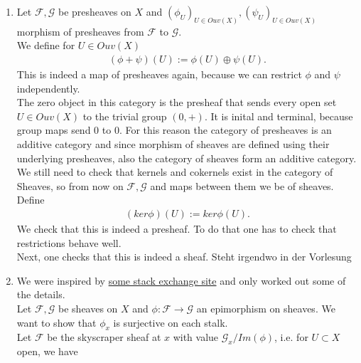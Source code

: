 \begin{exercise}{3}
    \begin{enumerate}
        \item Let $\mathcal{F}, \mathcal{G}$ be presheaves on $X$ and $(\phi_U)_{U\in Ouv(X)}, 
        (\psi_U)_{U\in Ouv(X)}$ morphism of presheaves from $\mathcal{F}$ to $\mathcal{G}$.\\
        We define for $U\in Ouv(X)$
        \begin{align*}
            (\phi+\psi)(U):=\phi(U)\oplus \psi(U).
        \end{align*}
        This is indeed a map of presheaves again, because we can
        restrict $\phi$ and $\psi$ independently.\\
        The zero object in this category is the presheaf that sends 
        every open set $U\in Ouv(X)$ to the trivial group $(0,+)$. 
        It is inital and terminal, because group maps send $0$ to $0$.
        For this reason the category of presheaves is an additive category
        and since morphism of sheaves are defined using their underlying
        presheaves, also the category of sheaves form an additive category.\\
        We still need to check that kernels and cokernels exist in the 
        category of Sheaves, so from now on $\mathcal{F},\mathcal{G}$
        and maps between them we be of sheaves.\\
        Define 
        \begin{align*}
            (ker\phi)(U):=ker\phi(U).
        \end{align*}
        We check that this is indeed a presheaf. To do that one has 
        to check that restrictions behave well.\\
        Next, one checks that this is indeed a sheaf.
        \iterate Steht irgendwo in der Vorlesung
    \item We were inspired by \href{https://math.stackexchange.com/questions/205658/an-easy-way-to-prove-that-epimorphism-of-sheaves-implies-surjectivity-on-stalk?rq=1}{some stack exchange site} 
        and only worked out some of the details.\\
    Let $\mathcal{F}, \mathcal{G}$ be sheaves on $X$ and $\phi:\mathcal{F}\to \mathcal{G}$ an 
    epimorphism on sheaves. We want to show that $\phi_x$ is surjective on each stalk.\\
    Let $\mathcal{F}$ be the skyscraper sheaf at $x$ with value $\mathcal{G}_x/Im(\phi)$, i.e. for 
    $U\subset X$ open, we have
    \begin{equation*}

\end{equation*}
\end{enumerate}
\end{exercise}
